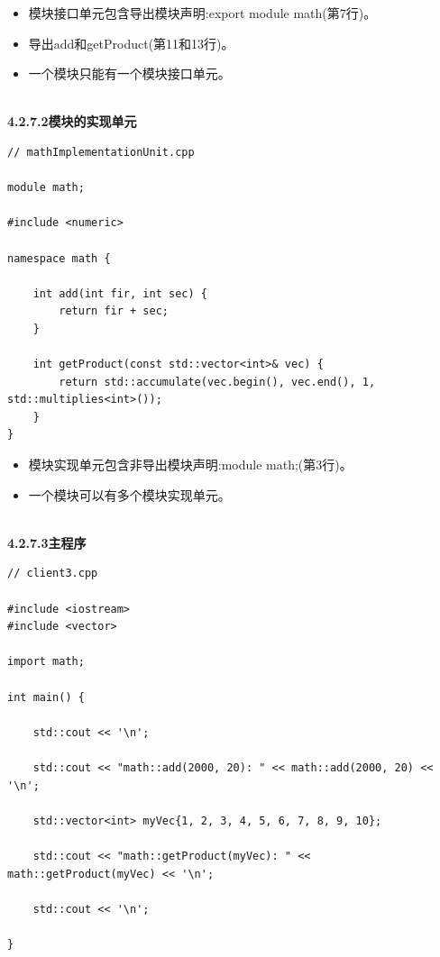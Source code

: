 \begin{itemize}
\item 
模块接口单元包含导出模块声明:export module math(第7行)。

\item 
导出add和getProduct(第11和13行)。

\item 
一个模块只能有一个模块接口单元。
\end{itemize}

\hspace*{\fill} \\ %
\noindent
\textbf{4.2.7.2\hspace{0.2cm}模块的实现单元}

\begin{lstlisting}[style=styleCXX]
// mathImplementationUnit.cpp

module math;

#include <numeric>

namespace math {

	int add(int fir, int sec) {
		return fir + sec;
	}
	
	int getProduct(const std::vector<int>& vec) {
		return std::accumulate(vec.begin(), vec.end(), 1, std::multiplies<int>());
	}
}
\end{lstlisting}

\begin{itemize}
\item 
模块实现单元包含非导出模块声明:module math;(第3行)。

\item 
一个模块可以有多个模块实现单元。
\end{itemize}

\hspace*{\fill} \\ %
\noindent
\textbf{4.2.7.3\hspace{0.2cm}主程序}

\begin{lstlisting}[style=styleCXX]
// client3.cpp

#include <iostream>
#include <vector>

import math;

int main() {

	std::cout << '\n';
	
	std::cout << "math::add(2000, 20): " << math::add(2000, 20) << '\n';
	
	std::vector<int> myVec{1, 2, 3, 4, 5, 6, 7, 8, 9, 10};
	
	std::cout << "math::getProduct(myVec): " << math::getProduct(myVec) << '\n';
	
	std::cout << '\n';

}
\end{lstlisting}

